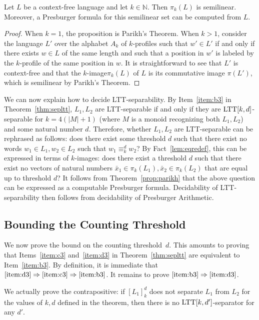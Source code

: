 \documentclass{LMCS}
\newcommand\nat{\ensuremath{\mathbb{N}}\xspace}
\newcommand{\ltt}{\textup{LTT}\xspace}
\newcommand\image[1]{$#1$-image\xspace}
\newcommand\images[1]{$#1$-images\xspace}
\newcommand\kimage{\image{k}}
\newcommand\kimages{\images{k}}
\newcommand\profile[1]{$#1$-profile\xspace}
\newcommand\profiles[1]{$#1$-profiles\xspace}
\newcommand\kprofile{\profile{k}}
\newcommand\kprofiles{\profiles{k}}
\newcommand\ltteq[2]{\ensuremath{\equiv_{#1}^{#2}}\xspace}
\newcommand\kdltteq{\ltteq{k}{d}}
\newcommand{\lttclos}[3]{\ensuremath{[#1]_{#2}^{#3}}}
\theoremstyle{plain}
\begin{document}
\begin{thm} \label{prop:parikh}
  Let $L$ be a context-free language and let $k \in \nat$. Then $\pi_k(L)$
  is semilinear. Moreover, a Presburger formula for this
  semilinear set can be computed from $L$. 
\end{thm}

\begin{proof}
  When $k=1$, the proposition is Parikh's Theorem. When $k > 1$,
  consider the language $L'$ over the alphabet $A_k$ of \kprofiles
  such that $w' \in L'$ if and only if there exists $w \in L$ of the
  same length and such that a position in $w'$ is labeled by the
  \kprofile of the same position in $w$. It is straightforward to see that $L'$ is
  context-free and that the \kimage  $\pi_k(L)$ of $L$ is its
  commutative image $\pi(L')$, which
  is semilinear by Parikh's Theorem.
\end{proof}

We can now explain how to decide \ltt-separability. By
Item~\eqref{item:b3} in Theorem~\ref{thm:sepltt}, $L_1,L_2$ are 
\ltt-separable if and only if they are $\ltt[k,d]$-separable for
$k=4(|M|+1)$ (where $M$ is a monoid recognizing both $L_1,  
L_2$) and some natural number $d$. Therefore, whether $L_1,L_2$ are
\ltt-separable can be rephrased as follows: does there exist some
threshold $d$ such that there exist no words $w_1 \in L_1,w_2 \in L_2$
such that $w_1 \kdltteq w_2$? By Fact~\ref{lem:eqredef}, this can be
expressed in terms of \kimages: does there exist a threshold $d$ such
that there exist no vectors of natural numbers
$\bar{x}_1\in\pi_k(L_1),\bar{x}_2\in\pi_k(L_2)$ that are 
equal up to threshold $d$? It follows from Theorem~\ref{prop:parikh}
that the above question can be expressed as a computable Presburger
formula. Decidability of  \ltt-separability then follows from
decidability of Presburger Arithmetic.

\subsection{Bounding the Counting Threshold}
\makeatletter{}We now prove the bound on the counting threshold~$d$. This amounts to proving
that Items~\eqref{item:c3} and~\eqref{item:d3} in Theorem~\ref{thm:sepltt}
are equivalent to Item~\eqref{item:b3}. By definition, it is immediate that
$\eqref{item:d3}\Rightarrow\eqref{item:c3}\Rightarrow \eqref{item:b3}$.
It remains to prove $\eqref{item:b3}\Rightarrow\eqref{item:d3}$.

\medskip
We actually prove the contrapositive: if $\lttclos{L_1}{k}{d}$ does
not separate $L_1$ from $L_2$ for the values of $k,d$ defined in the theorem,
then there is no $\ltt[k,d']$-separator for any $d'$.
\end{document}
